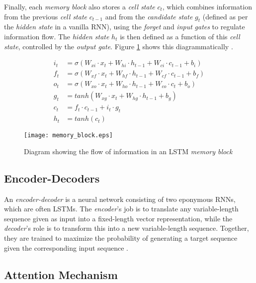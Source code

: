 Finally, each \textit{memory block} also stores a \textit{cell state} $c_t$, which combines information from the previous \textit{cell state} $c_{t-1}$ and from the \textit{candidate state} $g_t$ (defined as per the \textit{hidden state} in a vanilla RNN), using the \textit{forget} and \textit{input} \textit{gates} to regulate information flow. The \textit{hidden state} $h_t$ is then defined as a function of this \textit{cell state}, controlled by the \textit{output gate}. Figure \ref{fig:memory_block} shows this diagrammatically \cite{graves_hybrid_2013}.

\begin{equation}
\begin{aligned}
i_t &= \sigma(W_{xi} \cdot x_t + W_{hi} \cdot h_{t-1} + W_{ci} \cdot c_{t-1} + b_i) \\
f_t &= \sigma(W_{xf} \cdot x_t + W_{hf} \cdot h_{t-1} + W_{cf} \cdot c_{t-1} + b_f) \\
o_t &= \sigma(W_{xo} \cdot x_t + W_{ho} \cdot h_{t-1} + W_{co} \cdot c_t + b_o) \\
g_t &= tanh(W_{xg} \cdot x_t + W_{hg} \cdot h_{t-1} + b_g) \\
c_t &= f_t \cdot c_{t-1} + i_t \cdot g_t \\
h_t &= tanh(c_t)
\end{aligned}
\end{equation}

\begin{figure}[H]
\centering
\texttt{[image: memory\_block.eps]}
\caption{\cite{graves_hybrid_2013} Diagram showing the flow of information in an LSTM \textit{memory block}}
\label{fig:memory_block}
\end{figure}

\subsection{Encoder-Decoders}

An \textit{encoder-decoder} is a neural network consisting of two eponymous RNNs, which are often LSTMs. The \textit{encoder}'s job is to translate any variable-length sequence given as input into a fixed-length vector representation, while the \textit{decoder}'s role is to transform this into a new variable-length sequence. Together, they are trained to maximize the probability of generating a target sequence given the corresponding input sequence \cite{cho_learning_2014}.

\subsection{Attention Mechanism}


